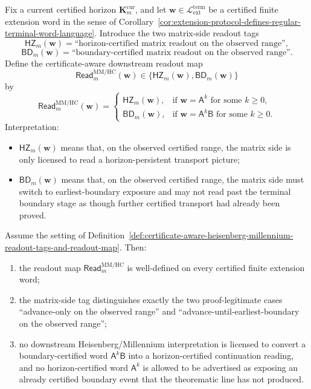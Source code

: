 \begin{definition}
\label{def:certificate-aware-heisenberg-millennium-readout-tags-and-readout-map}
Fix a current certified horizon \(\mathbf K_m^{\mathrm{cur}}\), and let \(\mathbf w\in \mathcal L_{\mathrm{ext}}^{\mathrm{term}}\) be a certified finite extension word in the sense of Corollary~\ref{cor:extension-protocol-defines-regular-terminal-word-language}. Introduce the two matrix-side readout tags
\[
  \mathsf{HZ}_{m}(\mathbf w) = \text{``horizon-certified matrix readout on the observed range''},
\]
\[
  \mathsf{BD}_{m}(\mathbf w) = \text{``boundary-certified matrix readout on the observed range''}.
\]
Define the certificate-aware downstream readout map
\[
  \mathsf{Read}^{\mathrm{MM/HC}}_{m}(\mathbf w)
  \in
  \{\mathsf{HZ}_{m}(\mathbf w),\mathsf{BD}_{m}(\mathbf w)\}
\]
by
\[
  \mathsf{Read}^{\mathrm{MM/HC}}_{m}(\mathbf w)
  =
  \begin{cases}
    \mathsf{HZ}_{m}(\mathbf w), & \text{if }\mathbf w=\mathsf A^k\text{ for some }k\ge 0,\\[2mm]
    \mathsf{BD}_{m}(\mathbf w), & \text{if }\mathbf w=\mathsf A^k\mathsf B\text{ for some }k\ge 0.
  \end{cases}
\]
Interpretation:
\begin{itemize}[leftmargin=2em]
  \item \(\mathsf{HZ}_{m}(\mathbf w)\) means that, on the observed certified range, the matrix side is only licensed to read a horizon-persistent transport picture;
  \item \(\mathsf{BD}_{m}(\mathbf w)\) means that, on the observed certified range, the matrix side must switch to earliest-boundary exposure and may not read past the terminal boundary stage as though further certified transport had already been proved.
\end{itemize}
\end{definition}

\begin{proposition}
\label{prop:certificate-aware-matrix-readout-is-faithful-to-certified-extension-language}
Assume the setting of Definition~\ref{def:certificate-aware-heisenberg-millennium-readout-tags-and-readout-map}. Then:
\begin{enumerate}[label=(\roman*)]
  \item the readout map \(\mathsf{Read}^{\mathrm{MM/HC}}_{m}\) is well-defined on every certified finite extension word;
  \item the matrix-side tag distinguishes exactly the two proof-legitimate cases ``advance-only on the observed range'' and ``advance-until-earliest-boundary on the observed range'';
  \item no downstream Heisenberg/Millennium interpretation is licensed to convert a boundary-certified word \(\mathsf A^k\mathsf B\) into a horizon-certified continuation reading, and no horizon-certified word \(\mathsf A^k\) is allowed to be advertised as exposing an already certified boundary event that the theorematic line has not produced.
\end{enumerate}
\end{proposition}


